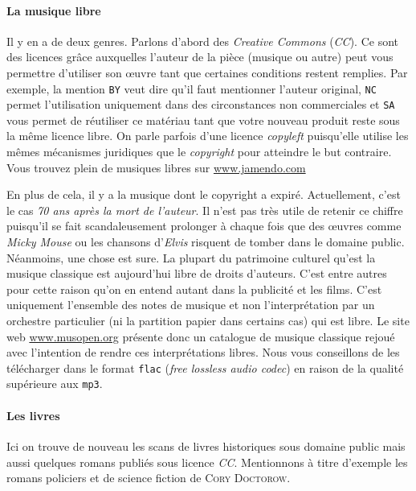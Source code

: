 \paragraph{La musique libre}
Il y en a de deux genres. Parlons d'abord des \textit{Creative Commons} (\textit{CC}). Ce sont des licences grâce auxquelles l'auteur de la pièce (musique ou autre) peut vous permettre
d'utiliser son \oe uvre tant que certaines conditions restent remplies. Par exemple, la mention \texttt{BY} veut dire qu'il faut mentionner l'auteur original, \texttt{NC} permet l'utilisation uniquement dans des circonstances non commerciales et \texttt{SA} vous permet de réutiliser ce matériau tant que votre nouveau produit reste sous la même licence libre. On parle parfois d'une licence \textit{copyleft} puisqu'elle utilise les mêmes mécanismes juridiques que le \textit{copyright} pour atteindre le but contraire. Vous trouvez plein de musiques libres sur \url{www.jamendo.com}

En plus de cela, il y a la musique dont le copyright a expiré. Actuellement, c'est le cas \textit{70 ans après la mort de l'auteur}.
Il n'est pas très utile de retenir ce chiffre puisqu'il se fait scandaleusement prolonger à chaque fois que des \oe uvres comme \textit{Micky Mouse} ou les chansons d'\textit{Elvis} risquent de tomber dans le domaine public.
Néanmoins, une chose est sure. La plupart du patrimoine culturel qu'est la musique classique est aujourd'hui libre de droits d'auteurs.
C'est entre autres pour cette raison qu'on en entend autant dans la publicité et les films.
C'est uniquement l'ensemble des notes de musique et non l'interprétation par un orchestre particulier (ni la partition papier dans certains cas) qui est libre.
Le site web \url{www.musopen.org} présente donc un catalogue de musique classique rejoué avec l'intention de rendre ces interprétations libres.
Nous vous conseillons de les télécharger dans le format \texttt{flac} (\textit{free lossless audio codec}) en raison de la qualité supérieure aux \texttt{mp3}.

\paragraph{Les livres}
Ici on trouve de nouveau les scans de livres historiques sous domaine public mais aussi quelques romans publiés sous licence \textit{CC}.
Mentionnons à titre d'exemple les romans policiers et de science fiction de \textsc{Cory Doctorow}.

